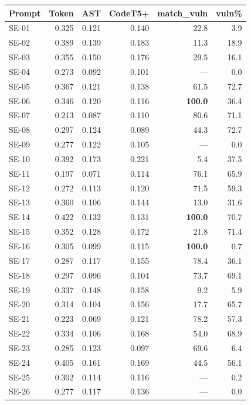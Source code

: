 \documentclass{article}
\begin{document}
\begin{table}[h]
\centering\footnotesize
\begin{tabular}{lrrrrr}
\toprule
Prompt & Token & AST & CodeT5+ & match\_vuln & vuln\% \\
\midrule
SE-01  & 0.325 & 0.121 & 0.140 &  22.8 &  3.9 \\
SE-02  & 0.389 & 0.139 & 0.183 &  11.3 & 18.9 \\
SE-03  & 0.355 & 0.150 & 0.176 &  29.5 & 16.1 \\
SE-04  & 0.273 & 0.092 & 0.101 &   --- &  0.0 \\
SE-05  & 0.367 & 0.121 & 0.138 &  61.5 & 72.7 \\
SE-06  & 0.346 & 0.120 & 0.116 & \textbf{100.0} & 36.4 \\
SE-07  & 0.213 & 0.087 & 0.110 &  80.6 & 71.1 \\
SE-08  & 0.297 & 0.124 & 0.089 &  44.3 & 72.7 \\
SE-09  & 0.277 & 0.122 & 0.105 &   --- &  0.0 \\
SE-10  & 0.392 & 0.173 & 0.221 &   5.4 & 37.5 \\
SE-11  & 0.197 & 0.071 & 0.114 &  76.1 & 65.9 \\
SE-12  & 0.272 & 0.113 & 0.120 &  71.5 & 59.3 \\
SE-13  & 0.360 & 0.106 & 0.144 &  13.0 & 31.6 \\
SE-14  & 0.422 & 0.132 & 0.131 & \textbf{100.0} & 70.7 \\
SE-15  & 0.352 & 0.128 & 0.172 &  21.8 & 71.4 \\
SE-16  & 0.305 & 0.099 & 0.115 & \textbf{100.0} &  0.7 \\
SE-17  & 0.287 & 0.117 & 0.155 &  78.4 & 36.1 \\
SE-18  & 0.297 & 0.096 & 0.104 &  73.7 & 69.1 \\
SE-19  & 0.337 & 0.148 & 0.158 &   9.2 &  5.9 \\
SE-20  & 0.314 & 0.104 & 0.156 &  17.7 & 65.7 \\
SE-21  & 0.223 & 0.069 & 0.121 &  78.2 & 57.3 \\
SE-22  & 0.334 & 0.106 & 0.168 &  54.0 & 68.9 \\
SE-23  & 0.285 & 0.123 & 0.097 &  69.6 &  6.4 \\
SE-24  & 0.405 & 0.161 & 0.169 &  44.5 & 56.1 \\
SE-25  & 0.302 & 0.114 & 0.116 &   --- &  0.2 \\
SE-26  & 0.277 & 0.117 & 0.136 &   --- &  0.0 \\

\end{tabular}
\end{table}
\end{document}
